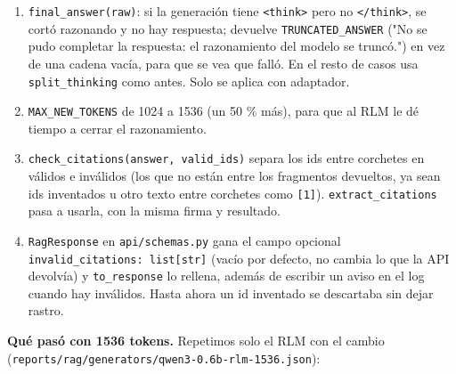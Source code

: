 \begin{enumerate}
\tightlist
\item
  \texttt{final\_\allowbreak{}answer(raw)}: si la generación tiene \texttt{\textless{}think\textgreater{}} pero no \texttt{\textless{}/\allowbreak{}think\textgreater{}}, se cortó razonando y no
  hay respuesta; devuelve \texttt{TRUNCATED\_\allowbreak{}ANSWER} ("No se pudo completar la respuesta: el razonamiento
  del modelo se truncó.") en vez de una cadena vacía, para que se vea que falló. En el resto de
  casos usa \texttt{split\_\allowbreak{}thinking} como antes. Solo se aplica con adaptador.
\item
  \texttt{MAX\_\allowbreak{}NEW\_\allowbreak{}TOKENS} de 1024 a 1536 (un 50 \% más), para que al RLM le dé tiempo a cerrar el
  razonamiento.
\item
  \texttt{check\_\allowbreak{}citations(answer, valid\_\allowbreak{}ids)} separa los ids entre corchetes en válidos e inválidos
  (los que no están entre los fragmentos devueltos, ya sean ids inventados u otro texto entre
  corchetes como \texttt{{[}1{]}}). \texttt{extract\_\allowbreak{}citations} pasa a usarla, con la misma firma y resultado.
\item
  \texttt{RagResponse} en \texttt{api/\allowbreak{}schemas.py} gana el campo opcional \texttt{invalid\_\allowbreak{}citations: list{[}str{]}}
  (vacío por defecto, no cambia lo que la API devolvía) y \texttt{to\_\allowbreak{}response} lo rellena, además de
  escribir un aviso en el log cuando hay inválidos. Hasta ahora un id inventado se descartaba sin
  dejar rastro.
\end{enumerate}

\textbf{Qué pasó con 1536 tokens.} Repetimos solo el RLM con el cambio
(\texttt{reports/\allowbreak{}rag/\allowbreak{}generators/\allowbreak{}qwen3-0.6b-rlm-1536.json}):

